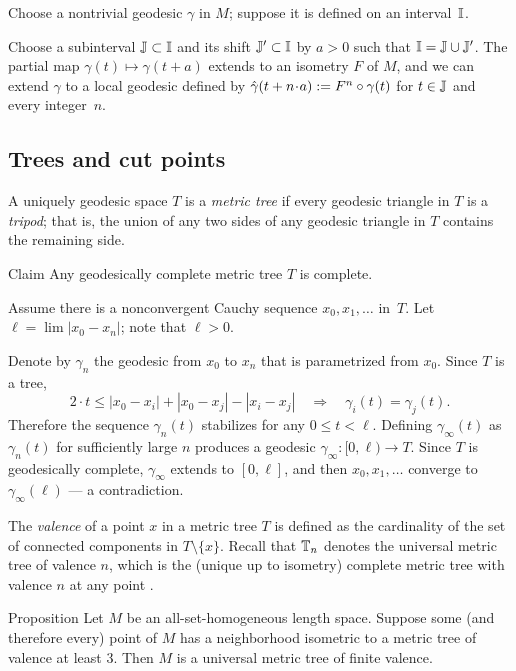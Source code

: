 \documentclass[a4paper,10pt]{article}
\begin{document}
Choose a nontrivial geodesic $\gamma$ in $M$;
suppose it is defined on an interval~$\mathbb{I}$.

Choose a subinterval $\mathbb{J}\subset \mathbb{I}$ and its shift $\mathbb{J}'\subset \mathbb{I}$ by $a>0$ such that $\mathbb{I}=\mathbb{J}\cup\mathbb{J}'$.
The partial map $\gamma(t)\mapsto \gamma(t+a)$ extends to an isometry $F$ of $M$,
and we can extend $\gamma$ to a local geodesic defined by $\hat\gamma(t+n\cdot a)\df F^n\circ \gamma(t)$
for $t\in \mathbb{J}$ and every integer~$n$.
\qeds

\subsection*{Trees and cut points}

A uniquely geodesic space $T$ is a \emph{metric tree} if every geodesic triangle in $T$ is a \emph{tripod};
that is, the union of any two sides of any geodesic triangle in $T$ contains the remaining side.

\begin{thm}{Claim}\label{clm:complete}
Any geodesically complete metric tree $T$ is complete.
\end{thm}

Assume there is a nonconvergent Cauchy sequence $x_0,x_1,\ldots$ in~$T$.
Let $\ell=\lim |x_0-x_n|$;
note that $\ell>0$.

Denote by $\gamma_n$ the geodesic from $x_0$ to $x_n$ that is parametrized from $x_0$.
Since $T$ is a tree,
\[2\cdot t\leqslant|x_0-x_i|+|x_0-x_j|-|x_i-x_j|
\quad\Rightarrow\quad
\gamma_i(t)=\gamma_j(t).\]
Therefore the sequence $\gamma_n(t)$ stabilizes for any $0\leqslant t<\ell$.
Defining $\gamma_\infty(t)$ as $\gamma_n(t)$ for sufficiently large $n$ produces a geodesic $\gamma_\infty \colon[0,\ell)\to T$.
Since $T$ is geodesically complete, $\gamma_\infty$ extends to $[0,\ell]$, and then $x_0,x_1,\ldots$ converge to $\gamma_\infty(\ell)$ --- a contradiction.
\qeds

The \emph{valence} of a point $x$ in a metric tree $T$ is defined as the cardinality of the set of connected components in $T\setminus \{x\}$.
Recall that $\mathbb{T}_n$ denotes the universal metric tree of valence $n$,
which is the (unique up to isometry) complete metric tree with valence $n$ at any point \cite{dyubina-polterovich}.

\begin{thm}{Proposition}\label{prop:global-tree}
Let $M$ be an all-set-homogeneous length space.
Suppose some (and therefore every) point of $M$ has a neighborhood isometric to a metric tree of valence at least $3$.
Then $M$ is a universal metric tree of finite valence.
\end{thm}
\end{document}
